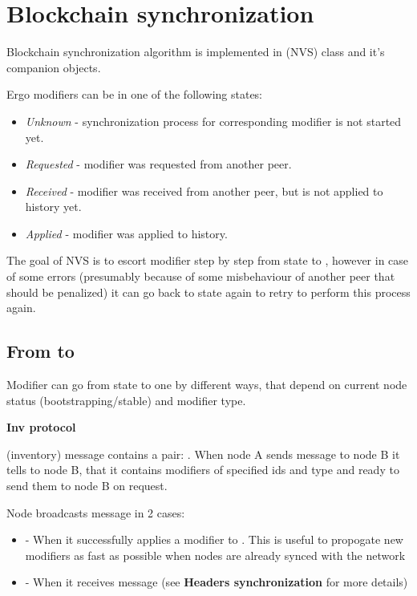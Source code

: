 \section{Blockchain synchronization}

Blockchain synchronization algorithm is implemented in (NVS) class and it's companion objects.


Ergo modifiers can be in one of the following states:

\begin{itemize}
    \item{\em Unknown} - synchronization process for corresponding modifier is not started yet.
    \item{\em Requested} - modifier was requested from another peer.
    \item{\em Received} - modifier was received from another peer, but is not applied to history yet.
    \item{\em Applied} - modifier was applied to history.
\end{itemize}

The goal of NVS is to escort modifier step by step from  state to ,
however in case of some errors (presumably because of some misbehaviour of another
peer that should be penalized) it can go back to  state again to retry to
perform this process again.

\subsection{From  to }

Modifier can go from  state to  one by different ways, that depend on
current node status (bootstrapping/stable) and modifier type.

\textbf{Inv protocol}

 (inventory) message contains a pair: . When node A sends  message
to node B it tells to node B, that it contains modifiers of specified ids and type and ready to send them to
node B on request.

Node broadcasts  message in 2 cases:
\begin{itemize}
    \item - When it successfully applies a modifier to . This is useful to propogate new modifiers
    as fast as possible when nodes are already synced with the network
    \item - When it receives  message (see \textbf{Headers synchronization} for more details)
\end{itemize}

